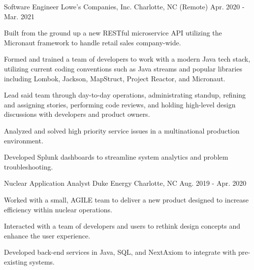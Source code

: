 \begin{cventries}
  \cventry
    {Software Engineer}
    {Lowe's Companies, Inc.}
    {Charlotte, NC (Remote)}
    {Apr. 2020 - Mar. 2021}
    {
        \begin{cvitems}
            \item {Built from the ground up a new RESTful microservice API utilizing the Micronaut framework to handle retail sales company-wide.}
            \item {Formed and trained a team of developers to work with a modern Java tech stack, utilizing current coding conventions such as Java streams and popular libraries including Lombok, Jackson, MapStruct, Project Reactor, and Micronaut.}
            \item {Lead said team through day-to-day operations, administrating standup, refining and assigning stories, performing code reviews, and holding high-level design discussions with developers and product  owners.}
            \item {Analyzed and solved high priority service issues in a multinational production environment.}
            \item {Developed Splunk dashboards to streamline system analytics and problem troubleshooting.}
        \end{cvitems}
    }
    
  \cventry
    {Nuclear Application Analyst}
    {Duke Energy}
    {Charlotte, NC}
    {Aug. 2019 - Apr. 2020}
    {
        \begin{cvitems}
            \item {Worked with a small, AGILE team to deliver a new product designed to increase efficiency within nuclear operations.}
            \item {Interacted with a team of developers and users to rethink design concepts and enhance the user experience.}
            \item {Developed back-end services in Java, SQL, and NextAxiom to integrate with pre-existing systems.}
        \end{cvitems}
    }
    

\end{cventries}
